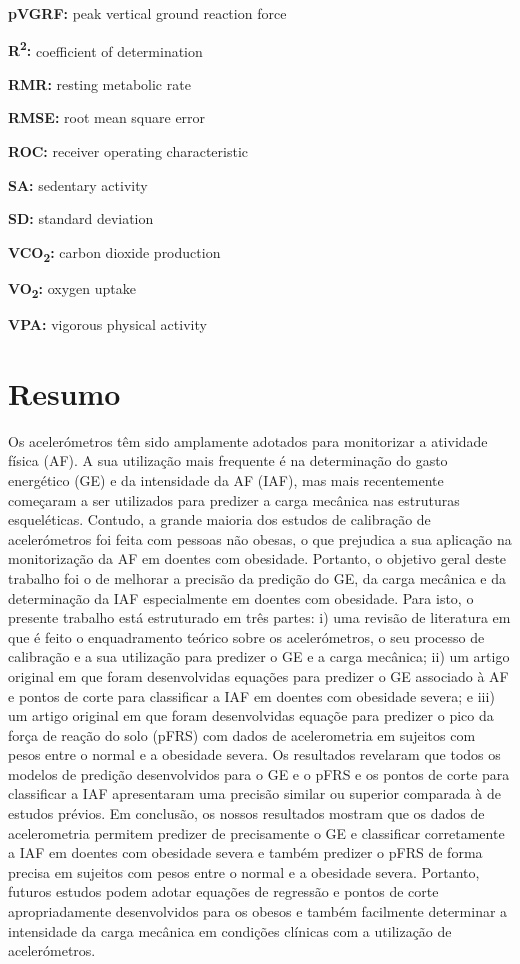 \documentclass[12pt]{article}
\begin{document}
\noindent \textbf{pVGRF:} peak vertical ground reaction force

\noindent \textbf{R\textsuperscript{2}:} coefficient of determination

\noindent \textbf{RMR:} resting metabolic rate

\noindent \textbf{RMSE:} root mean square error

\noindent \textbf{ROC:} receiver operating characteristic

\noindent \textbf{SA:} sedentary activity

\noindent \textbf{SD:} standard deviation

\noindent \textbf{VCO\textsubscript{2}:} carbon dioxide production

\noindent \textbf{VO\textsubscript{2}:} oxygen uptake

\noindent \textbf{VPA:} vigorous physical activity

\pagebreak

\section*{\hfil Resumo \hfil}
\vspace{0.5em}

\noindent Os acelerómetros têm sido amplamente adotados para monitorizar a atividade física (AF). A sua utilização mais frequente é na determinação do gasto energético (GE) e da intensidade da AF (IAF), mas mais recentemente começaram a ser utilizados para predizer a carga mecânica nas estruturas esqueléticas. Contudo, a grande maioria dos estudos de calibração de acelerómetros foi feita com pessoas não obesas, o que prejudica a sua aplicação na monitorização da AF em doentes com obesidade. Portanto, o objetivo geral deste trabalho foi o de melhorar a precisão da predição do GE, da carga mecânica e da determinação da IAF especialmente em doentes com obesidade. Para isto, o presente trabalho está estruturado em três partes: i) uma revisão de literatura em que é feito o enquadramento teórico sobre os acelerómetros, o seu processo de calibração e a sua utilização para predizer o GE e a carga mecânica; ii) um artigo original em que foram desenvolvidas equações para predizer o GE associado à AF e pontos de corte para classificar a IAF em doentes com obesidade severa; e iii) um artigo original em que foram desenvolvidas equaçõe para predizer o pico da força de reação do solo (pFRS) com dados de acelerometria em sujeitos com pesos entre o normal e a obesidade severa. Os resultados revelaram que todos os modelos de predição desenvolvidos para o GE e o pFRS e os pontos de corte para classificar a IAF apresentaram uma precisão similar ou superior comparada à de estudos prévios. Em conclusão, os nossos resultados mostram que os dados de acelerometria permitem predizer de precisamente o GE e classificar corretamente a IAF em doentes com obesidade severa e também predizer o pFRS de forma precisa em sujeitos com pesos entre o normal e a obesidade severa. Portanto, futuros estudos podem adotar equações de regressão e pontos de corte apropriadamente desenvolvidos para os obesos e também facilmente determinar a intensidade da carga mecânica em condições clínicas com a utilização de acelerómetros.
\end{document}
